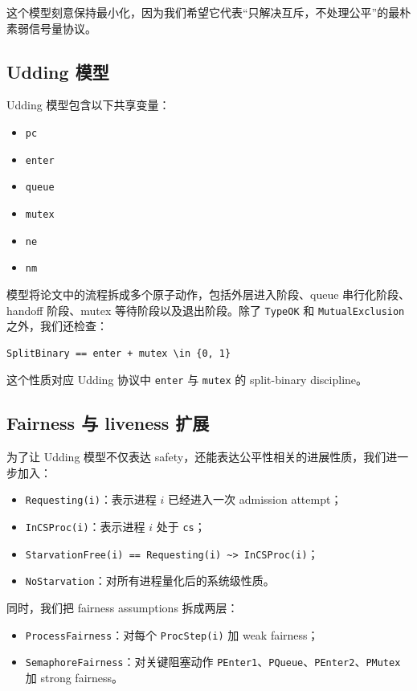 \documentclass[11pt]{ctexart}
\begin{document}
这个模型刻意保持最小化，因为我们希望它代表“只解决互斥，不处理公平”的最朴素弱信号量协议。

\subsection{Udding 模型}

Udding 模型包含以下共享变量：

\begin{itemize}
  \item \texttt{pc}
  \item \texttt{enter}
  \item \texttt{queue}
  \item \texttt{mutex}
  \item \texttt{ne}
  \item \texttt{nm}
\end{itemize}

模型将论文中的流程拆成多个原子动作，包括外层进入阶段、queue 串行化阶段、handoff 阶段、mutex 等待阶段以及退出阶段。除了 \texttt{TypeOK} 和 \texttt{MutualExclusion} 之外，我们还检查：

\begin{lstlisting}[language=TLA]
SplitBinary == enter + mutex \in {0, 1}
\end{lstlisting}

这个性质对应 Udding 协议中 \texttt{enter} 与 \texttt{mutex} 的 split-binary discipline。

\subsection{Fairness 与 liveness 扩展}

为了让 Udding 模型不仅表达 safety，还能表达公平性相关的进展性质，我们进一步加入：

\begin{itemize}
  \item \texttt{Requesting(i)}：表示进程 $i$ 已经进入一次 admission attempt；
  \item \texttt{InCSProc(i)}：表示进程 $i$ 处于 \texttt{cs}；
  \item \texttt{StarvationFree(i) == Requesting(i) \textasciitilde> InCSProc(i)}；
  \item \texttt{NoStarvation}：对所有进程量化后的系统级性质。
\end{itemize}

同时，我们把 fairness assumptions 拆成两层：

\begin{itemize}
  \item \texttt{ProcessFairness}：对每个 \texttt{ProcStep(i)} 加 weak fairness；
  \item \texttt{SemaphoreFairness}：对关键阻塞动作 \texttt{PEnter1}、\texttt{PQueue}、\texttt{PEnter2}、\texttt{PMutex} 加 strong fairness。
\end{itemize}
\end{document}
